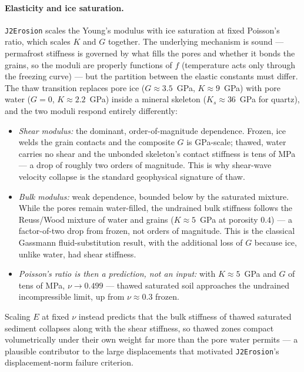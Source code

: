 \documentclass[12pt]{article}
\begin{document}
\paragraph{Elasticity and ice saturation.}
\texttt{J2Erosion} scales the Young's modulus with ice saturation at
fixed Poisson's ratio, which scales $K$ and $G$ together. The
underlying mechanism is sound --- permafrost stiffness is governed by
what fills the pores and whether it bonds the grains, so the moduli
are properly functions of $f$ (temperature acts only through the
freezing curve) --- but the partition between the elastic constants
must differ. The thaw transition replaces pore ice
($G \approx 3.5$~GPa, $K \approx 9$~GPa) with pore water ($G = 0$,
$K \approx 2.2$~GPa) inside a mineral skeleton
($K_s \approx 36$~GPa for quartz), and the two moduli respond
entirely differently:
\begin{itemize}
\item \emph{Shear modulus:} the dominant, order-of-magnitude
      dependence. Frozen, ice welds the grain contacts and the
      composite $G$ is GPa-scale; thawed, water carries no shear and
      the unbonded skeleton's contact stiffness is tens of MPa --- a
      drop of roughly two orders of magnitude. This is why shear-wave
      velocity collapse is the standard geophysical signature of
      thaw.
\item \emph{Bulk modulus:} weak dependence, bounded below by the
      saturated mixture. While the pores remain water-filled, the
      undrained bulk stiffness follows the Reuss/Wood mixture of
      water and grains ($K \approx 5$~GPa at porosity $0.4$) --- a
      factor-of-two drop from frozen, not orders of magnitude. This
      is the classical Gassmann fluid-substitution result, with the
      additional loss of $G$ because ice, unlike water, had shear
      stiffness.
\item \emph{Poisson's ratio is then a prediction, not an input:}
      with $K \approx 5$~GPa and $G$ of tens of MPa, $\nu \to 0.499$
      --- thawed saturated soil approaches the undrained
      incompressible limit, up from $\nu \approx 0.3$ frozen.
\end{itemize}
Scaling $E$ at fixed $\nu$ instead predicts that the bulk stiffness
of thawed saturated sediment collapses along with the shear
stiffness, so thawed zones compact volumetrically under their own
weight far more than the pore water permits --- a plausible
contributor to the large displacements that motivated
\texttt{J2Erosion}'s displacement-norm failure criterion.
\end{document}
